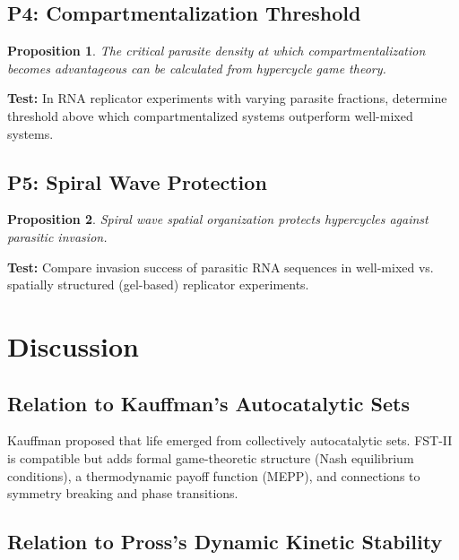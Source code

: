 \documentclass[12pt,a4paper]{article}
\newtheorem{proposition}{Proposition}
\theoremstyle{remark}
\begin{document}
\subsection{P4: Compartmentalization Threshold}

\begin{proposition}
The critical parasite density at which compartmentalization becomes advantageous can be calculated from hypercycle game theory.
\end{proposition}

\textbf{Test:} In RNA replicator experiments with varying parasite fractions, determine threshold above which compartmentalized systems outperform well-mixed systems.

\subsection{P5: Spiral Wave Protection}

\begin{proposition}
Spiral wave spatial organization protects hypercycles against parasitic invasion.
\end{proposition}

\textbf{Test:} Compare invasion success of parasitic RNA sequences in well-mixed vs. spatially structured (gel-based) replicator experiments.

\section{Discussion}
\label{sec:discussion}

\subsection{Relation to Kauffman's Autocatalytic Sets}

Kauffman \citep{Kauffman1993} proposed that life emerged from collectively autocatalytic sets. FST-II is compatible but adds formal game-theoretic structure (Nash equilibrium conditions), a thermodynamic payoff function (MEPP), and connections to symmetry breaking and phase transitions.

\subsection{Relation to Pross's Dynamic Kinetic Stability}
\end{document}

